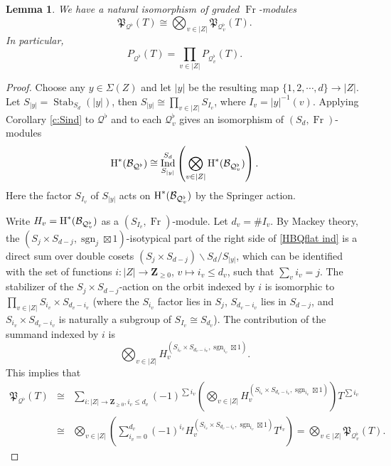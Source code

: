 \documentclass[reqno]{amsart}
\numberwithin{equation}{section}
\newcommand{\Z}{\mathbf{Z}}
\newcommand{\sgn}{\operatorname{sgn}}
\newcommand{\bs}{\backslash}
\DeclareMathOperator{\Frob}{Fr}
\DeclareMathOperator{\Ind}{Ind}
\DeclareMathOperator{\Stab}{Stab}
\newcommand\Sig{\Sigma}
\newcommand{\bt}{\boxtimes}
\newcommand\bigot{\bigotimes}
\newcommand{\cohog}[2]{\textup{H}^{#1}({#2})}     %
\newcommand\cB{\mathcal{B}}
\newcommand\cQ{\mathcal{Q}}
\newcommand\frP{\mathfrak{P}}
\newtheorem{lemma}[thm]{Lemma}
\theoremstyle{remark}
\numberwithin{equation}{section}
\begin{document}
\begin{lemma}\label{l:Spr factor}
We have a natural isomorphism of graded $\Frob$-modules
\begin{equation*}
\frP_{\cQ^{\flat}}(T)\cong\bigot_{v\in |Z|}\frP_{\cQ^{\flat}_{v}}(T).
\end{equation*}
In particular,
\begin{equation*}
P_{\cQ^{\flat}}(T)=\prod_{v\in |Z|}P_{\cQ^{\flat}_{v}}(T).
\end{equation*}
\end{lemma}
\begin{proof}
Choose any $y\in \Sig(Z)$ and let $|y|$ be the resulting map $\{1,2,\cdots, d\}\to |Z|$. Let $S_{|y|}=\Stab_{S_{d}}(|y|)$, then $S_{|y|}\cong \prod_{v\in|Z|}S_{I_{v}}$, where $I_{v}=|y|^{-1}(v)$. Applying  Corollary \ref{c:Sind} to $\cQ^{\flat}$ and to each $\cQ^{\flat}_{v}$ gives an isomorphism of $(S_{d},\Frob)$-modules 
\begin{equation}\label{HBQflat ind}
\cohog{*}{\cB_{\cQ^{\flat}}}\cong \Ind^{S_{d}}_{S_{|y|}}\left(\bigot_{v\in|Z|}\cohog{*}{\cB_{\cQ^{\flat}_{v}}}\right).
\end{equation}
Here the factor $S_{I_{v}}$ of $S_{|y|}$ acts on $\cohog{*}{\cB_{\cQ^{\flat}_{v}}}$ by the Springer action. 

Write $H_{v}=\cohog{*}{\cB_{\cQ^{\flat}_{v}}}$ as a $(S_{I_{v}},\Frob)$-module. Let $d_{v}=\# I_{v}$. By Mackey theory, the $(S_{j}\times S_{d-j}, \sgn_{j}\bt1)$-isotypical part of the right side of \eqref{HBQflat ind} is a direct sum over double cosets $(S_{j}\times S_{d-j})\bs S_{d}/S_{|y|}$, which can be identified with the set of functions $i: |Z|\to \Z_{\ge0}$, $v\mapsto i_{v}\le d_{v}$, such that $\sum_{v}i_{v}=j$. The stabilizer of the $S_{j}\times S_{d-j}$-action on the orbit indexed by $i$ is isomorphic to $\prod_{v\in |Z|}S_{i_{v}}\times S_{d_{v}-i_{v}}$ (where the $S_{i_{v}}$ factor lies in $S_{j}$, $S_{d_{v}-i_{v}}$ lies in $S_{d-j}$, and $S_{i_{v}}\times S_{d_{v}-i_{v}}$ is naturally a subgroup of $S_{I_{v}}\cong S_{d_{v}}$). The contribution of the summand indexed by $i$ is 
\begin{equation*}
\bigot_{v\in |Z|}H_{v}^{(S_{i_{v}}\times S_{d_{v}-i_{v}}, \sgn_{i_{v}}\bt 1)}.
\end{equation*}
This implies that
\begin{eqnarray*}
\frP_{\cQ^{\flat}}(T)&\cong &\sum_{i:|Z|\to \Z_{\ge0},  i_{v}\le d_{v}}(-1)^{\sum i_{v}}\left(\bigot_{v\in |Z|} H_{v}^{(S_{i_{v}}\times S_{d_{v}-i_{v}}, \sgn_{i_{v}}\bt 1)}\right)T^{\sum i_{v}}\\
&\cong&\bigot_{v\in |Z|}\left(\sum_{i_{v}=0}^{d_{v}} (-1)^{i_{v}}H_{v}^{(S_{i_{v}}\times S_{d_{v}-i_{v}}, \sgn_{i_{v}}\bt 1)}T^{i_{v}}\right) = \bigot_{v\in |Z|}\frP_{\cQ^{\flat}_{v}}(T).
\end{eqnarray*}
\end{proof}
\end{document}
